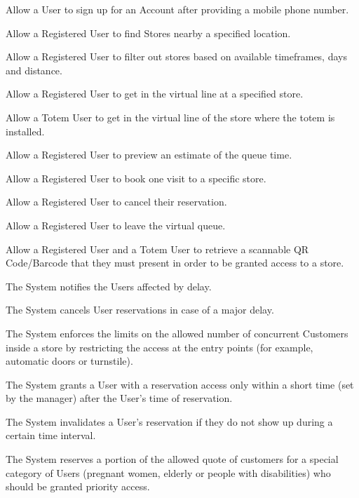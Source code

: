 \begin{enumerate}[label={[R\arabic*]}]
    \item Allow a User to sign up for an Account after providing a mobile phone number.
    \item Allow a Registered User to find Stores nearby a specified location.
    \item Allow a Registered User to filter out stores based on available timeframes, days and distance.   
    \item Allow a Registered User to get in the virtual line at a specified store.
    \item Allow a Totem User to get in the virtual line of the store where the totem is installed.
    \item Allow a Registered User to preview an estimate of the queue time.
    \item Allow a Registered User to book one visit to a specific store.
    \item Allow a Registered User to cancel their reservation.
    \item Allow a Registered User to leave the virtual queue.
    \item Allow a Registered User and a Totem User to retrieve a scannable QR Code/Barcode that they must present in order to be granted access to a store.

    \item The System notifies the Users affected by delay.
    \item The System cancels User reservations in case of a major delay.
    \item The System enforces the limits on the allowed number of concurrent Customers inside a store by restricting the access at the entry points (for example, automatic doors or turnstile).
    \item The System grants a User with a reservation access only within a short time (set by the manager) after the User's time of reservation.
    \item The System invalidates a User's reservation if they do not show up during a certain time interval.
    \item The System reserves a portion of the allowed quote of customers for a special category of Users (pregnant women, elderly or people with disabilities) who should be granted priority access.
    

\end{enumerate}
